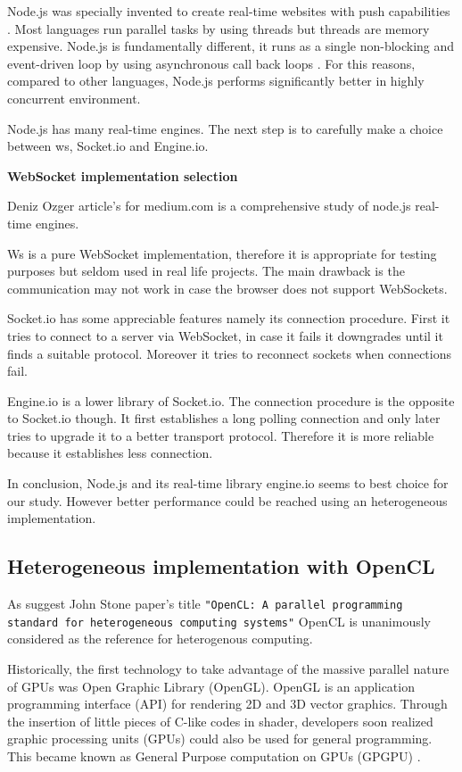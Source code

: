 Node.js was specially invented to create real-time websites with push
capabilities \citep{Reference35}. Most languages run parallel tasks by using
threads but threads are memory expensive. Node.js is fundamentally different,
it runs as a single non-blocking and event-driven loop by using asynchronous
call back loops \citep{Reference37}. For this reasons, compared to other
languages, Node.js performs significantly better in highly concurrent
environment.

Node.js has many real-time engines. The next step is to carefully make a choice
between ws, Socket.io and Engine.io.  

\textbf{WebSocket implementation selection}

Deniz Ozger article's for medium.com \citep{Reference36} is a comprehensive study
of node.js real-time engines.

Ws is a pure WebSocket implementation, therefore it is appropriate for testing
purposes but seldom used in real life projects.  The main drawback is the
communication may not work in case the browser does not support WebSockets.

Socket.io has some appreciable features namely its connection procedure. First
it tries to connect to a server via WebSocket, in case it fails it downgrades
until it finds a suitable protocol. Moreover it tries to reconnect sockets
when connections fail. 

Engine.io is a lower library of Socket.io. The connection procedure is the
opposite to Socket.io though. It first establishes a long polling connection
and only later tries to upgrade it to a better transport protocol. Therefore it
is more reliable because it establishes less connection.

In conclusion, Node.js and its real-time library engine.io seems to best choice
for our study. However better performance could be reached using an
heterogeneous implementation.


\subsection{Heterogeneous implementation with OpenCL}

As suggest John Stone paper's title \texttt{"OpenCL: A parallel programming standard
for heterogeneous computing systems"} \citep{Reference5} OpenCL is unanimously
considered as the reference for heterogenous computing.

Historically, the first technology to take advantage of the massive parallel
nature of GPUs was Open Graphic Library (OpenGL). OpenGL is an application
programming interface (API) for rendering 2D and 3D vector graphics. Through
the insertion of little pieces of C-like codes in shader, developers soon
realized graphic processing units (GPUs) could also be used for general
programming. This became known as General Purpose computation on GPUs (GPGPU)
\citep{Reference5}.


